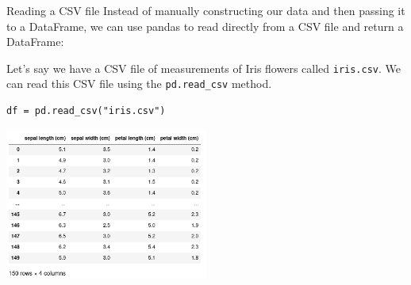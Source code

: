 \documentclass[10pt]{beamer}
\begin{document}
\begin{frame}[label={sec:orgf90a4fa},fragile]{Reading a CSV file}
 Instead of manually constructing our data and then passing it to a DataFrame, we
can use pandas to read directly from a CSV file and return a DataFrame:

Let's say we have a CSV file of measurements of Iris flowers called \texttt{iris.csv}. We
can read this CSV file using the \texttt{pd.read\_csv} method.

\begin{verbatim}
df = pd.read_csv("iris.csv")
\end{verbatim}

\begin{center}
\includegraphics[width=0.5\textwidth]{images/pandas.jpg}
\end{center}
\end{frame}
\end{document}
